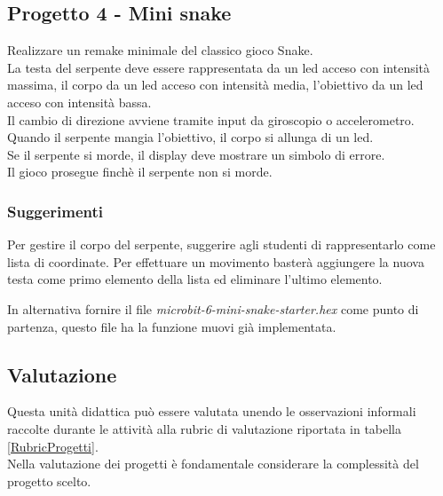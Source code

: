 \documentclass[../../docenti.tex]{subfiles}
\begin{document}
\subsection{Progetto 4 - Mini snake}
Realizzare un remake minimale del classico gioco Snake.\\
La testa del serpente deve essere rappresentata da un led acceso con intensità massima, il corpo da un led acceso con intensità media, l'obiettivo da un led acceso con intensità bassa.\\
Il cambio di direzione avviene tramite input da giroscopio o accelerometro.\\
Quando il serpente mangia l'obiettivo, il corpo si allunga di un led.\\
Se il serpente si morde, il display deve mostrare un simbolo di errore.\\
Il gioco prosegue finchè il serpente non si morde.

\subsubsection{Suggerimenti}
Per gestire il corpo del serpente, suggerire agli studenti di rappresentarlo come lista di coordinate. Per effettuare un movimento basterà aggiungere la nuova testa come primo elemento della lista ed eliminare l'ultimo elemento.

In alternativa fornire il file \textit{microbit-6-mini-snake-starter.hex} come punto di partenza, questo file ha la funzione muovi già implementata.

\newpage
\subsection{Valutazione}
Questa unità didattica può essere valutata unendo le osservazioni informali raccolte durante le attività alla rubric di valutazione riportata in tabella \ref{RubricProgetti}.\\
Nella valutazione dei progetti è fondamentale considerare la complessità del progetto scelto.
\end{document}
